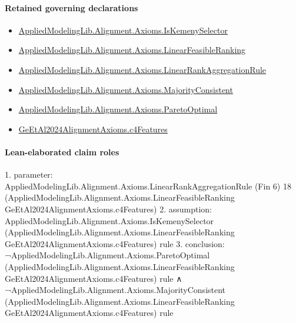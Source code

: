 \documentclass[10pt]{article}
\begin{document}
\paragraph{Retained governing declarations}
\begin{itemize}\raggedright
\item \hyperlink{library-prerequisite-8c9b06e1ee6dc104}{Applied\allowbreak{}Modeling\allowbreak{}Lib.\allowbreak{}Alignment.\allowbreak{}Axioms.\allowbreak{}Is\allowbreak{}Kemeny\allowbreak{}Selector}
\item \hyperlink{library-prerequisite-3c30aae25bef2671}{Applied\allowbreak{}Modeling\allowbreak{}Lib.\allowbreak{}Alignment.\allowbreak{}Axioms.\allowbreak{}Linear\allowbreak{}Feasible\allowbreak{}Ranking}
\item \hyperlink{library-prerequisite-43447e121a1884f9}{Applied\allowbreak{}Modeling\allowbreak{}Lib.\allowbreak{}Alignment.\allowbreak{}Axioms.\allowbreak{}Linear\allowbreak{}Rank\allowbreak{}Aggregation\allowbreak{}Rule}
\item \hyperlink{library-prerequisite-5d6a6008c423d214}{Applied\allowbreak{}Modeling\allowbreak{}Lib.\allowbreak{}Alignment.\allowbreak{}Axioms.\allowbreak{}Majority\allowbreak{}Consistent}
\item \hyperlink{library-prerequisite-80fdf9d21d096dc8}{Applied\allowbreak{}Modeling\allowbreak{}Lib.\allowbreak{}Alignment.\allowbreak{}Axioms.\allowbreak{}Pareto\allowbreak{}Optimal}
\item \hyperlink{governing-declaration-2f0a2cc3cce8bb61}{Ge\allowbreak{}Et\allowbreak{}Al2024\allowbreak{}Alignment\allowbreak{}Axioms.\allowbreak{}c4\allowbreak{}Features}
\end{itemize}
\paragraph{Lean-elaborated claim roles}\begin{ReviewVerbatim}
1. parameter: AppliedModelingLib.Alignment.Axioms.LinearRankAggregationRule (Fin 6) 18
  (AppliedModelingLib.Alignment.Axioms.LinearFeasibleRanking GeEtAl2024AlignmentAxioms.c4Features)
2. assumption: AppliedModelingLib.Alignment.Axioms.IsKemenySelector
  (AppliedModelingLib.Alignment.Axioms.LinearFeasibleRanking GeEtAl2024AlignmentAxioms.c4Features) rule
3. conclusion: ¬AppliedModelingLib.Alignment.Axioms.ParetoOptimal
      (AppliedModelingLib.Alignment.Axioms.LinearFeasibleRanking GeEtAl2024AlignmentAxioms.c4Features) rule ∧
  ¬AppliedModelingLib.Alignment.Axioms.MajorityConsistent
      (AppliedModelingLib.Alignment.Axioms.LinearFeasibleRanking GeEtAl2024AlignmentAxioms.c4Features) rule
\end{ReviewVerbatim}
\end{document}
